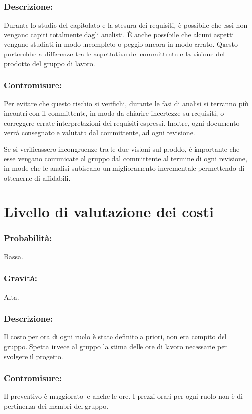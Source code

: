 \documentclass[a4paper]{report}
\begin{document}
			\subsubsection{Descrizione:}
				Durante lo studio del capitolato e la stesura dei requisiti, è possibile che essi non vengano 
				capiti totalmente dagli analisti. È anche possibile che alcuni aspetti vengano studiati in modo 
				incompleto o peggio ancora in modo errato. Questo porterebbe a differenze tra le aspettative del 
				committente e la visione del prodotto del gruppo di lavoro.
			\subsubsection{Contromisure:}
				Per evitare che questo rischio si verifichi, durante le fasi di analisi si terranno più incontri 
				con il committente, in modo da chiarire incertezze su requisiti, o correggere errate interpretazioni 
				dei requisiti espressi. Inoltre, ogni documento verrà consegnato e valutato dal committente, ad ogni 
				revisione.
				
				Se si verificassero incongruenze tra le due visioni sul proddo, è importante che esse vengano comunicate 
				al gruppo dal committente al termine di ogni revisione, in modo che le analisi subiscano un miglioramento 
				incrementale permettendo di ottenerne di affidabili.
		\section{Livello di valutazione dei costi}
			\subsubsection{Probabilità:}
				Bassa.
			\subsubsection{Gravità:}
				Alta.
			\subsubsection{Descrizione:}
				Il costo per ora di ogni ruolo è stato definito a priori, non era compito del gruppo. Spetta invece al 
				gruppo la stima delle ore di lavoro necessarie per svolgere il progetto.
			\subsubsection{Contromisure:}
				Il preventivo è maggiorato, e anche le ore. I prezzi orari per ogni ruolo non è di pertinenza dei membri 
				del gruppo.
\end{document}
